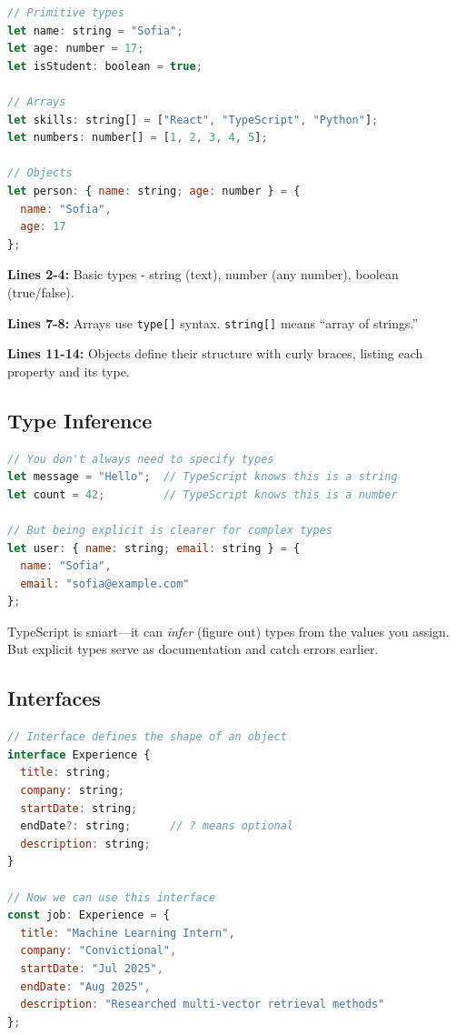 \documentclass[12pt,a4paper]{article}
\begin{document}
\begin{lstlisting}[language=JavaScript,caption={TypeScript basic types}]
// Primitive types
let name: string = "Sofia";
let age: number = 17;
let isStudent: boolean = true;

// Arrays
let skills: string[] = ["React", "TypeScript", "Python"];
let numbers: number[] = [1, 2, 3, 4, 5];

// Objects
let person: { name: string; age: number } = {
  name: "Sofia",
  age: 17
};
\end{lstlisting}

\begin{explanation}
\textbf{Lines 2-4:} Basic types - string (text), number (any number), boolean (true/false).

\textbf{Lines 7-8:} Arrays use \texttt{type[]} syntax. \texttt{string[]} means ``array of strings.''

\textbf{Lines 11-14:} Objects define their structure with curly braces, listing each property and its type.
\end{explanation}

\subsection{Type Inference}

\begin{lstlisting}[language=JavaScript,caption={TypeScript infers types automatically}]
// You don't always need to specify types
let message = "Hello";  // TypeScript knows this is a string
let count = 42;         // TypeScript knows this is a number

// But being explicit is clearer for complex types
let user: { name: string; email: string } = {
  name: "Sofia",
  email: "sofia@example.com"
};
\end{lstlisting}

\begin{concept}
TypeScript is smart---it can \textit{infer} (figure out) types from the values you assign. But explicit types serve as documentation and catch errors earlier.
\end{concept}

\subsection{Interfaces}

\begin{lstlisting}[language=JavaScript,caption={Defining reusable type shapes}]
// Interface defines the shape of an object
interface Experience {
  title: string;
  company: string;
  startDate: string;
  endDate?: string;      // ? means optional
  description: string;
}

// Now we can use this interface
const job: Experience = {
  title: "Machine Learning Intern",
  company: "Convictional",
  startDate: "Jul 2025",
  endDate: "Aug 2025",
  description: "Researched multi-vector retrieval methods"
};
\end{lstlisting}
\end{document}

